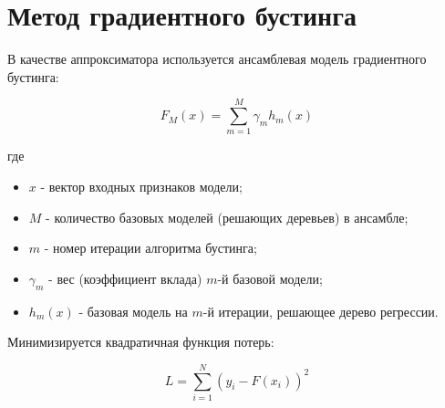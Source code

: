 \documentclass[%
]{ittmm}
\begin{document}




\section{Метод градиентного бустинга}

В качестве аппроксиматора используется ансамблевая модель градиентного бустинга:

\begin{equation}
F_M(x)=\sum_{m=1}^{M}\gamma_m h_m(x)
\end{equation}

где 

\begin{itemize}
  \item $x$ - вектор входных признаков модели;
  \item $M$ - количество базовых моделей (решающих деревьев) в ансамбле;
  \item $m$ - номер итерации алгоритма бустинга;
  \item $\gamma_m$ - вес (коэффициент вклада) $m$-й базовой модели;
  \item $h_m(x)$ - базовая модель на $m$-й итерации, решающее дерево регрессии.
\end{itemize}

Минимизируется квадратичная функция потерь:

\begin{equation}
L=\sum_{i=1}^{N}\left(y_i-F(x_i)\right)^2
\end{equation}
\end{document}

